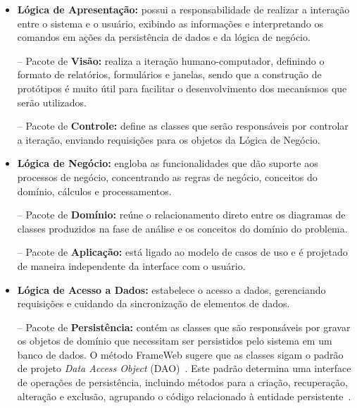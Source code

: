 \begin{itemize}

	\item \textbf{Lógica de Apresentação:} possui a responsabilidade de realizar a interação entre o sistema e o usuário, exibindo as informações e interpretando os comandos em ações da persistência de dados e da lógica de negócio.
		
		\subitem -- Pacote de \textbf{Visão:} realiza a iteração humano-computador, definindo o formato de relatórios, formulários e janelas, sendo que a construção de protótipos é muito útil para facilitar o desenvolvimento dos mecanismos que serão utilizados. 
		
		\subitem -- Pacote de \textbf{Controle:} define as classes que serão responsáveis por controlar a iteração, enviando requisições para os objetos da Lógica de Negócio.  
	
	\item \textbf{Lógica de Negócio:} engloba as funcionalidades que dão suporte aos processos de negócio, concentrando as regras de negócio, conceitos do domínio, cálculos e processamentos.
	
		\subitem -- Pacote de \textbf{Domínio:} reúne o relacionamento direto entre os diagramas de classes produzidos na fase de análise e os conceitos do domínio do problema. 
		
		\subitem -- Pacote de \textbf{Aplicação:} está ligado ao modelo de casos de uso e é projetado de maneira independente da interface com o usuário.
	
	\item \textbf{Lógica de Acesso a Dados:} estabelece o acesso a dados, gerenciando requisições e cuidando da sincronização de elementos de dados.
	
		\subitem -- Pacote de \textbf{Persistência:} contém as classes que são responsáveis por gravar os objetos de domínio que necessitam ser persistidos pelo sistema em um banco de dados. O método FrameWeb sugere que as classes sigam o padrão de projeto \textit{Data Access Object} (DAO)~\cite{alur-et-al:bpds03}. Este padrão determina uma interface de operações de persistência, incluindo métodos para a criação, recuperação, alteração e exclusão, agrupando o código relacionado à entidade persistente~\cite{bauer-et-al:jpwh07}. 

\end{itemize}


